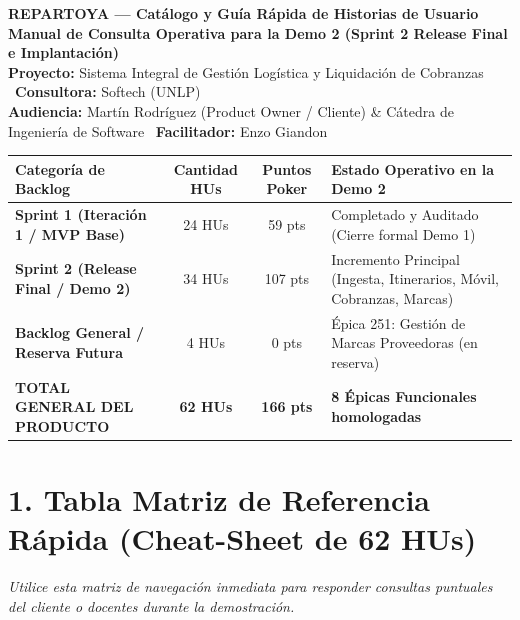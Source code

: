 \documentclass[a4paper,9pt]{article}
\begin{document}
\begin{center}
  {\LARGE\bfseries REPARTOYA — Catálogo y Guía Rápida de Historias de Usuario}\\[2pt]
  {\normalsize\bfseries Manual de Consulta Operativa para la Demo 2 (Sprint 2 Release Final e Implantación)}\\[3pt]
  {\footnotesize\textbf{Proyecto:} Sistema Integral de Gestión Logística y Liquidación de Cobranzas \textbar\ \textbf{Consultora:} Softech (UNLP)}\\[1pt]
  {\scriptsize\textbf{Audiencia:} Martín Rodríguez (Product Owner / Cliente) \& Cátedra de Ingeniería de Software \textbar\ \textbf{Facilitador:} Enzo Giandon}
\end{center}
\vspace{-4pt}

\begin{tcolorbox}[summarybox, title=\textbf{Balance Consolidado del Backlog Oficial (Sincronizado desde Taiga)}, colbacktitle=secondarydark, fonttitle=\bfseries\color{purewhite}]
\begin{tabularx}{\linewidth}{p{4.8cm} c c X}
\textbf{Categoría de Backlog} & \textbf{Cantidad HUs} & \textbf{Puntos Poker} & \textbf{Estado Operativo en la Demo 2} \\
\midrule
\textbf{Sprint 1 (Iteración 1 / MVP Base)} & 24 HUs & 59 pts & Completado y Auditado (Cierre formal Demo 1) \\
\textbf{Sprint 2 (Release Final / Demo 2)} & 34 HUs & 107 pts & Incremento Principal (Ingesta, Itinerarios, Móvil, Cobranzas, Marcas) \\
\textbf{Backlog General / Reserva Futura} & 4 HUs & 0 pts & Épica 251: Gestión de Marcas Proveedoras (en reserva) \\
\midrule
\textbf{TOTAL GENERAL DEL PRODUCTO} & \textbf{62 HUs} & \textbf{166 pts} & \textbf{8 Épicas Funcionales homologadas} \\
\end{tabularx}
\end{tcolorbox}

\vspace{-2pt}
\section{1. Tabla Matriz de Referencia Rápida (Cheat-Sheet de 62 HUs)}
\noindent\textit{Utilice esta matriz de navegación inmediata para responder consultas puntuales del cliente o docentes durante la demostración.}
\vspace{3pt}
\end{document}
